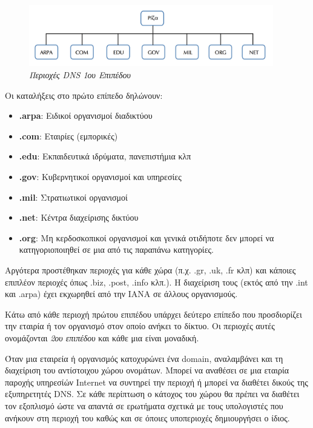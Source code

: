 \begin{figure}[!ht]
  \centering
  \includegraphics[width=0.95\textwidth]{images/chapter6/6-1}
  \caption {\textsl{Περιοχές DNS 1ου Επιπέδου}}
  \label{6-1}
\end{figure}

Οι καταλήξεις στο πρώτο επίπεδο δηλώνουν:

\begin{itemize}
\item \textbf{.arpa}: Ειδικοί οργανισμοί διαδικτύου
\item \textbf{.com}: Εταιρίες (εμπορικές)
\item \textbf{.edu}: Εκπαιδευτικά ιδρύματα, πανεπιστήμια κλπ
\item \textbf{.gov}: Κυβερνητικοί οργανισμοί και υπηρεσίες
\item \textbf{.mil}: Στρατιωτικοί οργανισμοί
\item \textbf{.net}: Κέντρα διαχείρισης δικτύου
\item \textbf{.org}: Μη κερδοσκοπικοί οργανισμοί και γενικά οτιδήποτε δεν μπορεί να κατηγοριοποιηθεί σε μια από τις παραπάνω κατηγορίες.
\end{itemize}

Αργότερα προστέθηκαν περιοχές για κάθε χώρα (π.χ. .gr, .uk, .fr κλπ) και κάποιες επιπλέον περιοχές όπως .biz, .post, .info κλπ.). Η διαχείριση τους (εκτός από την .int και .arpa) έχει εκχωρηθεί από την IANA σε άλλους οργανισμούς.

Κάτω από κάθε περιοχή πρώτου επιπέδου υπάρχει δεύτερο επίπεδο που προσδιορίζει την εταιρία ή τον οργανισμό στον οποίο ανήκει το δίκτυο. Οι περιοχές αυτές ονομάζονται \emph{2ου επιπέδου} και κάθε μια είναι μοναδική. 

Όταν μια εταιρεία ή οργανισμός κατοχυρώνει ένα domain, αναλαμβάνει και τη διαχείριση του αντίστοιχου χώρου ονομάτων. Μπορεί να αναθέσει σε μια εταιρία παροχής υπηρεσίών Internet να συντηρεί την περιοχή ή μπορεί να διαθέτει δικούς της εξυπηρετητές DNS. Σε κάθε περίπτωση ο κάτοχος του χώρου θα πρέπει να διαθέτει τον εξοπλισμό ώστε να απαντά σε ερωτήματα σχετικά με τους υπολογιστές που ανήκουν στη περιοχή του καθώς και σε όποιες υποπεριοχές δημιουργήσει ο ίδιος.

